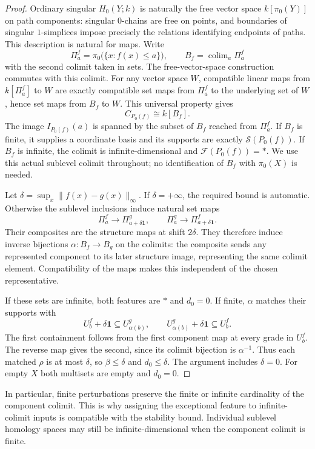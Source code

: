 \documentclass[11pt]{article}
\newcommand{\one}{\mathbf 1}
\newcommand{\colim}{\mathop{\mathrm{colim}}}
\begin{document}
\begin{proof}
Ordinary singular $H_0(Y;k)$ is naturally the free vector space
$k[\pi_0(Y)]$ on path components: singular $0$-chains are free on points,
and boundaries of singular $1$-simplices impose precisely the relations
identifying endpoints of paths. This description is natural for maps.
Write
\[
 \Pi_a^f=\pi_0\bigl(\{x:f(x)\leq a\}\bigr),\qquad
 B_f=\colim_a\Pi_a^f
\]
with the second colimit taken in sets. The free-vector-space construction
commutes with this colimit. For any vector space $W$, compatible linear maps
from $k[\Pi_a^f]$ to $W$ are exactly compatible set maps from $\Pi_a^f$ to
the underlying set of $W$, hence set maps from $B_f$ to $W$. This universal
property gives
\[
 C_{P_0(f)}\cong k[B_f].
\]
The image $I_{P_0(f)}(a)$ is spanned by the subset of $B_f$ reached from
$\Pi_a^f$. If $B_f$ is finite, it supplies a coordinate basis and its supports
are exactly $\mathcal S(P_0(f))$. If $B_f$ is infinite, the colimit is
infinite-dimensional and $\mathcal F(P_0(f))=*$. We use this actual sublevel
colimit throughout; no identification of $B_f$ with $\pi_0(X)$ is needed.

Let $\delta=\sup_x\|f(x)-g(x)\|_\infty$. If $\delta=+\infty$, the required
bound is automatic. Otherwise the sublevel inclusions induce natural set maps
\[
 \Pi_a^f\longrightarrow\Pi_{a+\delta\one}^g,
 \qquad
 \Pi_a^g\longrightarrow\Pi_{a+\delta\one}^f.
\]
Their composites are the structure maps at shift $2\delta$. They therefore
induce inverse bijections $\alpha:B_f\to B_g$ on the colimits: the composite
sends any represented component to its later structure image, representing
the same colimit element. Compatibility of the maps makes this independent
of the chosen representative.

If these sets are infinite, both features are $*$ and $d_0=0$. If finite,
$\alpha$ matches their supports with
\[
 U_b^f+\delta\one\subseteq U_{\alpha(b)}^g,
 \qquad
 U_{\alpha(b)}^g+\delta\one\subseteq U_b^f.
\]
The first containment follows from the first component map at every grade
in $U_b^f$. The reverse map gives the second, since its colimit bijection
is $\alpha^{-1}$. Thus each matched $\rho$ is at most $\delta$, so
$\beta\leq\delta$ and $d_0\leq\delta$. The argument includes $\delta=0$.
For empty $X$ both multisets are empty and $d_0=0$.
\end{proof}

In particular, finite perturbations preserve the finite or infinite
cardinality of the component colimit. This is why assigning the exceptional
feature to infinite-colimit inputs is compatible with the stability bound.
Individual sublevel homology spaces may still be infinite-dimensional when
the component colimit is finite.
\end{document}

